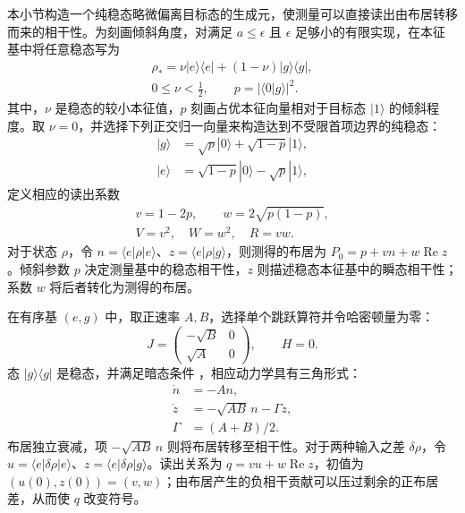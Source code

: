 \documentclass[aps,pra,reprint,amsmath,amssymb,nofootinbib,floatfix,longbibliography]{revtex4-2}
\theoremstyle{aps}
\newcommand{\eps}{\epsilon}
\newcommand{\ket}[1]{|#1\rangle}
\newcommand{\bra}[1]{\langle#1|}
\newcommand{\proj}[1]{|#1\rangle\langle#1|}
\begin{document}
本小节构造一个纯稳态略微偏离目标态的生成元，使测量可以直接读出由布居转移而来的相干性。为刻画倾斜角度，对满足 $a\le\eps$ 且 $\eps$ 足够小的有限实现，在本征基中将任意稳态写为
\begin{equation}\label{eq:stationary}
 \begin{gathered}
 \rho_*=\nu\proj e+(1-\nu)\proj g,\\
 0\le\nu<\tfrac12,\qquad p=|\langle0|g\rangle|^2.
 \end{gathered}
\end{equation}
其中，$\nu$ 是稳态的较小本征值，$p$ 刻画占优本征向量相对于目标态 $\ket1$ 的倾斜程度。取 $\nu=0$，并选择下列正交归一向量来构造达到不受限首项边界的纯稳态：
\begin{equation}\label{eq:familybasis}
 \begin{aligned}
 \ket g&=\sqrt p\ket0+\sqrt{1-p}\ket1,\\
 \ket e&=\sqrt{1-p}\ket0-\sqrt p\ket1,
 \end{aligned}
\end{equation}
定义相应的读出系数
\begin{equation}\label{eq:vw}
 \begin{gathered}
 v=1-2p,\qquad w=2\sqrt{p(1-p)},\\
 V=v^2,\quad W=w^2,\quad R=vw.
 \end{gathered}
\end{equation}
对于状态 $\rho$，令 $n=\bra e\rho\ket e$、$z=\bra e\rho\ket g$，则测得的布居为 $P_0=p+vn+w\operatorname{Re}z$。倾斜参数 $p$ 决定测量基中的稳态相干性，$z$ 则描述稳态本征基中的瞬态相干性；系数 $w$ 将后者转化为测得的布居。

在有序基 $(e,g)$ 中，取正速率 $A,B$，选择单个跳跃算符并令哈密顿量为零：
\begin{equation}\label{eq:familyjump}
 J=\begin{pmatrix}-\sqrt B&0\\\sqrt A&0\end{pmatrix},\qquad H=0.
\end{equation}
态 $\proj g$ 是稳态，并满足暗态条件 \cite{Kraus2008}，相应动力学具有三角形式：
\begin{equation}\label{eq:triangular}
 \begin{aligned}
 \dot n&=-An,\\
 \dot z&=-\sqrt{AB}\,n-\Gamma z,\\
 \Gamma&=(A+B)/2.
 \end{aligned}
\end{equation}
布居独立衰减，项 $-\sqrt{AB}\,n$ 则将布居转移至相干性。对于两种输入之差 $\delta\rho$，令 $u=\bra e\delta\rho\ket e$、$z=\bra e\delta\rho\ket g$。读出关系为 $q=vu+w\operatorname{Re}z$，初值为 $(u(0),z(0))=(v,w)$；由布居产生的负相干贡献可以压过剩余的正布居差，从而使 $q$ 改变符号。
\end{document}

